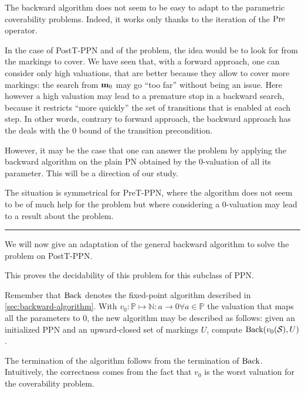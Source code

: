 The backward algorithm does not seem to be easy to adapt to the parametric coverability problems.
Indeed, it works only thanks to the iteration of the $\operatorname{Pre}$ operator.

In the case of PostT-\ac{PPN} and of the \Ecov problem, the idea would be to look for \mari from the markings to cover.
We have seen that, with a forward approach, one can consider only high valuations, that are better because they allow to cover more markings: the search from $\mathbf{m}_0$ may go ``too far'' without being an issue.
Here however a high valuation may lead to a premature stop in a backward search, because it restricts ``more quickly'' the set of transitions that is enabled at each step.
In other words, contrary to forward approach, the backward approach has the deals with the 0 bound of the transition precondition. 

However, it may be the case that one can answer the \Ucov problem by applying the backward algorithm on the plain \ac{PN} obtained by the 0-valuation of all its parameter.
This will be a direction of our study.

The situation is symmetrical for PreT-\ac{PPN}, where the algorithm does not seem to be of much help for the \Ucov problem but where considering a 0-valuation may lead to a result about the \Ecov problem.

\rule{5cm}{1pt}

We will now give an adaptation of the general backward algorithm to solve the \Ucov problem on PostT-\ac{PPN}.

This proves the decidability of this problem for this subclass of \ac{PPN}.

Remember that $\operatorname{Back}$ denotes the fixed-point algorithm described in \autoref{sec:backward-algorithm}.
With $v_0 : \mathbb{P} \mapsto \mathbb{N} : a \rightarrow 0 \forall a \in \mathbb{P}$ the valuation that maps all the parameters to 0, the new algorithm may be described as follows:
given an initialized \ac{PPN} \SPTPm and an upward-closed set of markings $U$, compute $\operatorname{Back}(v_0(\mathcal{S}), U)$.

The termination of the algorithm follows from the termination of $\operatorname{Back}$.
Intuitively, the correctness comes from the fact that $v_0$ is the worst valuation for the coverability problem.

